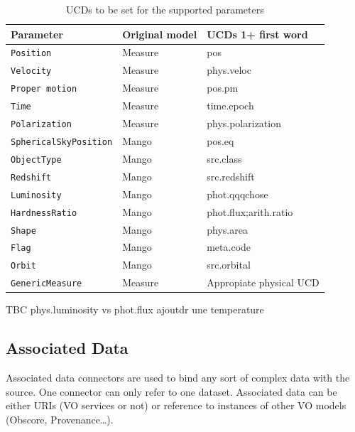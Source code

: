 \documentclass[11pt,a4paper]{ivoa}
\begin{document}
\begin{table}[ht!]
     \begin{tabular}{|p{4cm}|p{3cm}|p{3.5cm}|}
       \hline Parameter &  Original model & UCDs 1+ first word  \\
       \hline  \texttt{Position}             &  Measure  &  pos \\       
       \hline  \texttt{Velocity  }            &  Measure & phys.veloc      \\              
       \hline  \texttt{Proper motion}    & Measure & pos.pm    \\       
       \hline  \texttt{Time}                   & Measure &  time.epoch   \\       
       \hline  \texttt{Polarization}         & Measure & phys.polarization \\      
       \hline  \texttt{SphericalSkyPosition}    &  Mango  &  pos.eq \\       
       \hline  \texttt{ObjectType}                   &  Mango  & src.class \\       
       \hline  \texttt{Redshift}                        &  Mango  & src.redshift \\       
       \hline  \texttt{Luminosity}                    &  Mango  & phot.qqqchose \\
       \hline  \texttt{HardnessRatio}             &  Mango  & phot.flux;arith.ratio \\
       \hline  \texttt{Shape}                     &  Mango  & phys.area \\
       \hline  \texttt{Flag}                        &  Mango  & meta.code  \\
       \hline  \texttt{Orbit}                       &  Mango  & src.orbital \\    
       \hline  \texttt{GenericMeasure}    &  Measure  &  Appropiate physical UCD \\    
       \hline 
     \end{tabular}
     \caption{ UCDs to be set for the supported parameters} 
     \label{tab:ucds}
 \end{table}

TBC phys.luminosity  vs phot.flux
ajoutdr une temperature

\subsection{Associated Data} 
Associated data connectors are used to bind any sort of complex data with the source. One connector can only refer to one dataset. Associated data can be either URIs (VO services or not) or reference to instances of other VO models (Obscore, Provenance…).
\end{document}
